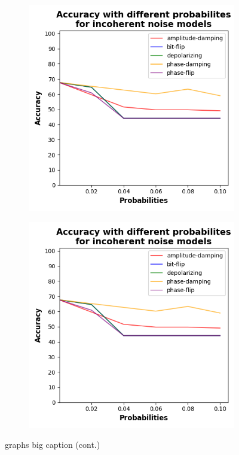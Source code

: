 \begin{figure}[!b]
    \medskip
    
    \begin{subfigure}{0.39\textwidth}
        \includegraphics[width=\linewidth]{figures/accuracy-graph.png}
        \label{fig:arm15}
    \end{subfigure}
    \begin{subfigure}{0.39\textwidth}
        \includegraphics[width=\linewidth]{figures/accuracy-graph.png}
        \label{fig:arm16}
    \end{subfigure}

    \caption{graphs big caption (cont.)}
\end{figure}